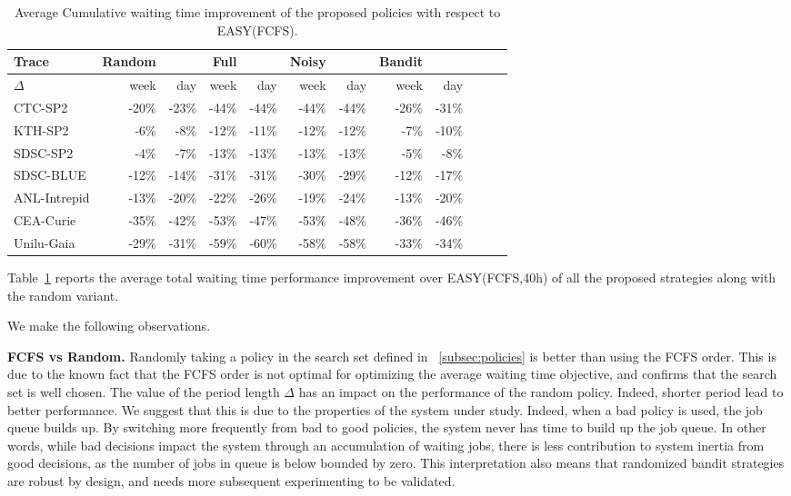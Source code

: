 \documentclass[sigconf,anonymous]{acmart}
\newcommand{\ra}[1]{\renewcommand{\arraystretch}{#1}}
\begin{document}
\begin{table}[]
  \centering
  \ra{1.3}
  \caption{Average Cumulative waiting time improvement of the proposed policies with respect to EASY(FCFS).}
  \label{tab:strat}
  \begin{tabular}{@{}lrrrrrrrrrrr@{}}
    \hline
    Trace        & Random &       & Full  &       & Noisy &       & Bandit & \\
    \hline
    $\Delta$     & week   & day   & week  & day   & week  & day   & week   & day \\
    CTC-SP2      & -20\%  & -23\% & -44\% & -44\% & -44\% & -44\% & -26\%  & -31\% \\
    KTH-SP2      & -6\%   & -8\%  & -12\% & -11\% & -12\% & -12\% & -7\%   & -10\% \\
    SDSC-SP2     & -4\%   & -7\%  & -13\% & -13\% & -13\% & -13\% & -5\%   & -8\% \\
    SDSC-BLUE    & -12\%  & -14\% & -31\% & -31\% & -30\% & -29\% & -12\%  & -17\% \\
    ANL-Intrepid & -13\%  & -20\% & -22\% & -26\% & -19\% & -24\% & -13\%  & -20\% \\
    CEA-Curie    & -35\%  & -42\% & -53\% & -47\% & -53\% & -48\% & -36\%  & -46\% \\
    Unilu-Gaia   & -29\%  & -31\% & -59\% & -60\% & -58\% & -58\% & -33\%  & -34\% \\
    \hline
  \end{tabular}
\end{table}

Table~\ref{tab:strat} reports the average total waiting time performance
improvement over EASY(FCFS,40h) of all the proposed strategies along with the
random variant.

We make the following observations.

\textbf{FCFS vs Random.} Randomly taking a policy in the search set defined in
~\ref{subsec:policies} is better than using the FCFS order. This is due to the
known fact that the FCFS order is not optimal for optimizing the average
waiting time objective, and confirms that the search set is well chosen.  The
value of the period length $\Delta$ has an impact on the performance of the
random policy. Indeed, shorter period lead to better performance. We
suggest that this is due to the properties of the system under study. Indeed,
when a bad policy is used, the job queue builds up. By switching more
frequently from bad to good policies, the system never has time to build up the
job queue. In other words, while bad decisions impact the system through an
accumulation of waiting jobs, there is less contribution to system inertia from
good decisions, as the number of jobs in queue is below bounded by zero. This
interpretation also means that randomized bandit strategies are robust by
design, and needs more subsequent experimenting to be validated.
\end{document}

